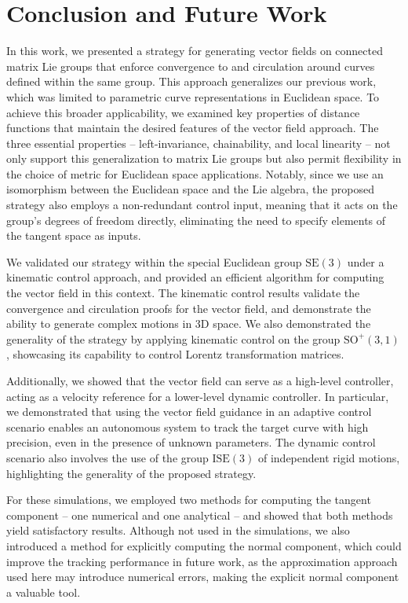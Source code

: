 \chapter{Conclusion and Future Work}\label{ch:conclusion}
In this work, we presented a strategy for generating vector fields on connected matrix Lie groups that enforce convergence to and circulation around curves defined within the same group. This approach generalizes our previous work, which was limited to parametric curve representations in Euclidean space. To achieve this broader applicability, we examined key properties of distance functions that maintain the desired features of the vector field approach. The three essential properties -- left-invariance, chainability, and local linearity -- not only support this generalization to matrix Lie groups but also permit flexibility in the choice of metric for Euclidean space applications. Notably, since we use an isomorphism between the Euclidean space and the Lie algebra, the proposed strategy also employs a non-redundant control input, meaning that it acts on the group's degrees of freedom directly, eliminating the need to specify elements of the tangent space as inputs.

We validated our strategy within the special Euclidean group $\text{SE}(3)$ under a kinematic control approach, and provided an efficient algorithm for computing the vector field in this context. The kinematic control results validate the convergence and circulation proofs for the vector field, and demonstrate the ability to generate complex motions in 3D space. We also demonstrated the generality of the strategy by applying kinematic control on the group $\text{SO}^+(3, 1)$, showcasing  its capability to control Lorentz transformation matrices.

Additionally, we showed that the vector field can serve as a high-level controller, acting as a velocity reference for a lower-level dynamic controller. In particular, we demonstrated that using the vector field guidance in an adaptive control scenario enables an autonomous system to track the target curve with high precision, even in the presence of unknown parameters. The dynamic control scenario also involves the use of the group $\text{ISE}(3)$ of independent rigid motions, highlighting the generality of the proposed strategy.

For these simulations, we employed two methods for computing the tangent component -- one numerical and one analytical -- and showed that both methods yield satisfactory results. Although not used in the simulations, we also introduced a method for explicitly computing the normal component, which could improve the tracking performance in future work, as the approximation approach used here may introduce numerical errors, making the explicit normal component a valuable tool.

